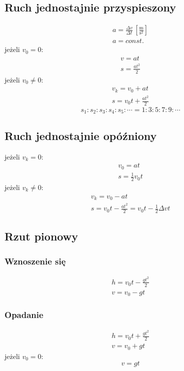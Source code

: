 \documentclass{article}
\numberwithin{equation}{section}
\newcommand{\unit}[1]{\, \left[\mathrm{#1}\right]}
\begin{document}
    \subsection{Ruch jednostajnie przyspieszony}
      \begin{gather}
        a = \frac{\Delta v}{\Delta t} \unit{\frac{m}{s^2}}\\
        a = const.
      \end{gather}
      jeżeli $v_0 = 0$:
      \begin{gather}
        v = at\\
        s = \frac{at^2}{2}
      \end{gather}
      jeżeli $v_0 \ne 0$:
      \begin{gather}
        v_k = v_0 + at\\
        s = v_0t + \frac{at^2}{2}
      \end{gather}
      \begin{equation}
        s_1:s_2:s_3:s_4:s_5:\cdots = 1:3:5:7:9:\cdots
      \end{equation}
    \subsection{Ruch jednostajnie opóźniony}
      jeżeli $v_k = 0$:
      \begin{gather}
        v_0 = at\\
        s = \frac{1}{2}v_0t
      \end{gather}
      jeżeli $v_k \ne 0$:
      \begin{gather}
        v_k = v_0 - at\\
        s = v_0t - \frac{at^2}{2} = v_0t - \frac{1}{2}\Delta vt
      \end{gather}
    \subsection{Rzut pionowy}
      \subsubsection{Wznoszenie się}
        \begin{gather}
          h = v_0t - \frac{gt^2}{2}\\
          v = v_0 - gt
        \end{gather}
      \subsubsection{Opadanie}
        \begin{gather}
          h = v_0t + \frac{gt^2}{2}\\
          v = v_0 + gt
        \end{gather}
        jeżeli $v_0 = 0$:
        \begin{equation}
          v = gt
        \end{equation}
\end{document}
